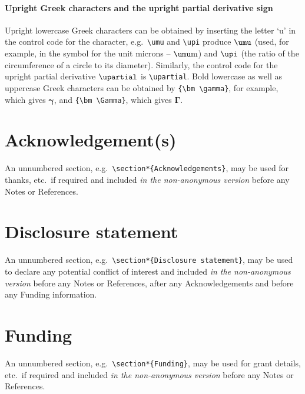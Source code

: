 \documentclass[]{interact}
\theoremstyle{plain}%
\theoremstyle{definition}
\theoremstyle{remark}
\begin{document}
\paragraph{Upright Greek characters and the upright partial derivative sign}
Upright lowercase Greek characters can be obtained by inserting the letter `u' in the control code for the character, e.g.\ \verb"\umu" and \verb"\upi" produce $\umu$ (used, for example, in the symbol for the unit microns -- $\umu\mathrm{m}$) and $\upi$ (the ratio of the circumference of a circle to its diameter). Similarly, the control code for the upright partial derivative $\upartial$ is \verb"\upartial". Bold lowercase as well as uppercase Greek characters can be obtained by \verb"{\bm \gamma}", for example, which gives ${\bm \gamma}$, and \verb"{\bm \Gamma}", which gives ${\bm \Gamma}$.


\section*{Acknowledgement(s)}

An unnumbered section, e.g.\ \verb"\section*{Acknowledgements}", may be used for thanks, etc.\ if required and included \emph{in the non-anonymous version} before any Notes or References.


\section*{Disclosure statement}

An unnumbered section, e.g.\ \verb"\section*{Disclosure statement}", may be used to declare any potential conflict of interest and included \emph{in the non-anonymous version} before any Notes or References, after any Acknowledgements and before any Funding information.


\section*{Funding}

An unnumbered section, e.g.\ \verb"\section*{Funding}", may be used for grant details, etc.\ if required and included \emph{in the non-anonymous version} before any Notes or References.
\end{document}

